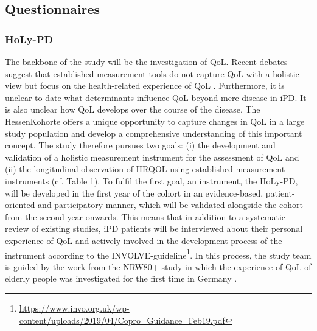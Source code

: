 \subsection{Questionnaires}
\label{subsec:questionnaires}
\subsubsection{\acl{HoLy-PD}}
\label{questionnaires:holy}
The backbone of the study will be the investigation of \ac{QoL}. Recent debates suggest that established measurement tools do not capture \ac{QoL} with a holistic view but focus on the health-related experience of \ac{QoL} \cite{stuhrenberg2022jpm,Karimi2016}. Furthermore, it is unclear to date what determinants influence \ac{QoL} beyond mere disease in \ac{iPD}. It is also unclear how \ac{QoL} develops over the course of the disease. The HessenKohorte offers a unique opportunity to capture changes in \ac{QoL} in a large study population and develop a comprehensive understanding of this important concept. The study therefore pursues two goals: (i) the development and validation of a holistic measurement instrument for the assessment of \ac{QoL} and (ii) the longitudinal observation of \ac{HRQOL} using established measurement instruments (cf. Table 1). 
To fulfil the first goal, an instrument, the \ac{HoLy-PD}, will be developed in the first year of the cohort in an evidence-based, patient-oriented and participatory manner, which will be validated alongside the cohort from the second year onwards.  This means that in addition to a systematic review of existing studies, \ac{iPD} patients will be interviewed about their personal experience of \ac{QoL} and actively involved in the development process of the instrument according to the INVOLVE-guideline\footnote{\url{https://www.invo.org.uk/wp-content/uploads/2019/04/Copro_Guidance_Feb19.pdf}}. In this process, the study team is guided by the work from the NRW80+ study in which the experience of \ac{QoL} of elderly people was investigated for the first time in Germany \cite{wagner2017}.

